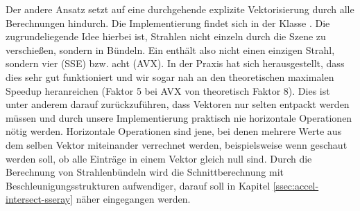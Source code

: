 Der andere Ansatz setzt auf eine durchgehende explizite Vektorisierung durch alle Berechnungen hindurch.
Die Implementierung findet sich in der Klasse .
Die zugrundeliegende Idee hierbei ist, Strahlen nicht einzeln durch die Szene zu verschießen, sondern in Bündeln.
Ein  enthält also nicht einen einzigen Strahl, sondern vier (SSE) bzw. acht (AVX).
In der Praxis hat sich herausgestellt, dass dies sehr gut funktioniert und wir sogar nah an den theoretischen maximalen Speedup heranreichen (Faktor 5 bei AVX von theoretisch Faktor 8).
Dies ist unter anderem darauf zurückzuführen, dass Vektoren nur selten entpackt werden müssen und durch unsere Implementierung praktisch nie horizontale Operationen nötig werden.
Horizontale Operationen sind jene, bei denen mehrere Werte aus dem selben Vektor miteinander verrechnet werden, beispielsweise wenn geschaut werden soll, ob alle Einträge in einem Vektor gleich null sind.
Durch die Berechnung von Strahlenbündeln wird die Schnittberechnung mit Beschleunigungsstrukturen aufwendiger, darauf soll in Kapitel \ref{ssec:accel-intersect-sseray} näher eingegangen werden.

